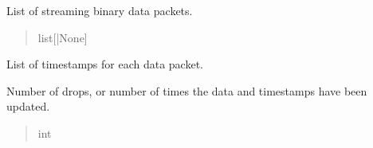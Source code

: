 \documentclass[letterpaper,10pt,english]{sphinxmanual}
\begin{document}
\begin{fulllineitems}
\begin{fulllineitems}
\begin{quote}
\begin{description}
\end{description}\end{quote}

\end{fulllineitems}


\begin{fulllineitems}
\label{\detokenize{PodApi.Stream:PodApi.Stream.DataHose.Hose.data}}
\pysigstartsignatures
{}
\pysigstopsignatures
\sphinxAtStartPar
List of streaming binary data packets.
\begin{quote}\begin{description}
\sphinxAtStartPar
list{[}{\hyperref[\detokenize{PodApi.Packets:PodApi.Packets.Packet.Packet}]{}}|None{]}

\end{description}\end{quote}

\end{fulllineitems}



\begin{fulllineitems}

\pysigstartsignatures
{}
\pysigstopsignatures
\sphinxAtStartPar
List of timestamps for each data packet.

\end{fulllineitems}


\begin{fulllineitems}
\label{\detokenize{PodApi.Stream:PodApi.Stream.DataHose.Hose.numDrops}}
\pysigstartsignatures
{}
\pysigstopsignatures
\sphinxAtStartPar
Number of drops, or number of times the data and             timestamps have been updated.
\begin{quote}\begin{description}
\sphinxAtStartPar
int

\end{description}\end{quote}

\end{fulllineitems}


\end{fulllineitems}
\end{document}
